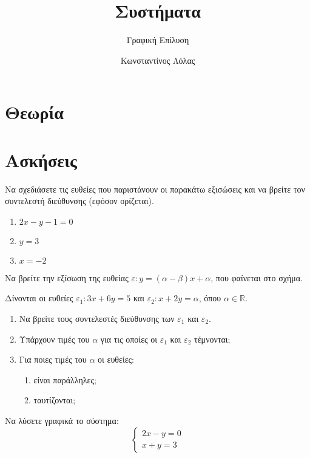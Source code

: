 \documentclass{../presentation}
\title{Συστήματα}
\subtitle{Γραφική Επίλυση}
\author[Λόλας]{Κωνσταντίνος Λόλας}
\begin{document}
\begin{frame}
  \titlepage
\end{frame}

\section{Θεωρία}
\begin{frame}
\end{frame}

\section{Ασκήσεις}
\exercises

\begin{askisi}
  Να σχεδιάσετε τις ευθείες που παριστάνουν οι παρακάτω εξισώσεις και να βρείτε τον συντελεστή διεύθυνσης (εφόσον ορίζεται).
  \begin{enumerate}[<+->]
    \item $2x-y-1=0$
    \item $y=3$
    \item $x=-2$
  \end{enumerate}
\end{askisi}

\begin{askisi}
  Να βρείτε την εξίσωση της ευθείας $ε:y=(α-β)x+α$, που φαίνεται στο σχήμα.
\end{askisi}

\begin{askisi}
  Δίνονται οι ευθείες $ε_1:3x+6y=5$ και $ε_2:x+2y=α$, όπου $α\in\mathbb{R}$.
  \begin{enumerate}[<+->]
    \item Να βρείτε τους συντελεστές διεύθυνσης των $ε_1$ και $ε_2$.
    \item Υπάρχουν τιμές του $α$ για τις οποίες οι $ε_1$ και $ε_2$ τέμνονται;
    \item Για ποιες τιμές του $α$ οι ευθείες:
          \begin{enumerate}
            \item είναι παράλληλες;
            \item ταυτίζονται;
          \end{enumerate}
  \end{enumerate}
\end{askisi}

\begin{askisi}
  Να λύσετε γραφικά το σύστημα: $$\begin{cases} 2x-y=0 \\ x+y=3 \end{cases}$$
\end{askisi}
\end{document}
